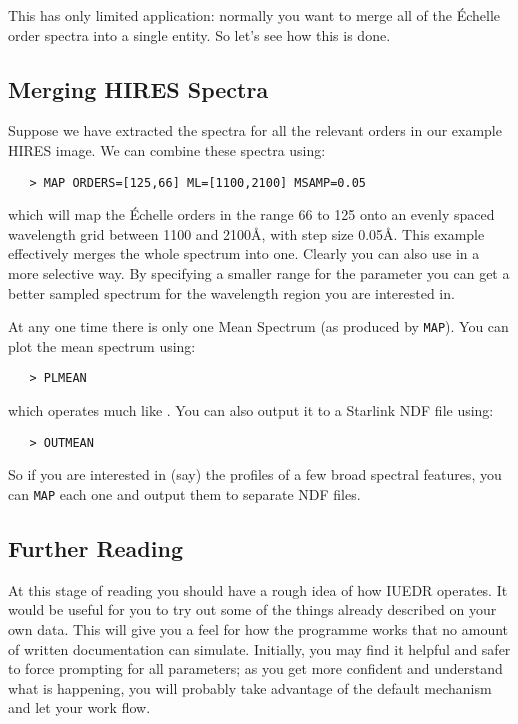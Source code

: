 This has only limited application: normally you want to merge all of the
\'{E}chelle order spectra into a single entity.  So let's see how this is done.


\subsection{Merging HIRES Spectra}

Suppose we have extracted the spectra for all the relevant orders in our
example HIRES image.  We can combine these spectra using:

\begin{verbatim}
   > MAP ORDERS=[125,66] ML=[1100,2100] MSAMP=0.05
\end{verbatim}

which will map the \'{E}chelle orders in the range 66 to 125 onto an evenly
spaced wavelength grid between 1100 and 2100\AA , with step size 0.05\AA\@.
This example effectively merges the whole spectrum into one.  Clearly you can
also use 
 in a more selective way.  By specifying a smaller range for
the 
 parameter you can get a better sampled spectrum
for the wavelength region you are interested in.

At any one time there is only one Mean Spectrum (as produced by \verb+MAP+)\@.
You can plot the mean spectrum using:

\begin{verbatim}
   > PLMEAN
\end{verbatim}

which operates much like \@.  You can also
output it to a Starlink NDF file using:

\begin{verbatim}
   > OUTMEAN
\end{verbatim}

So if you are interested in (say) the profiles of a few broad spectral
features, you can \verb+MAP+ each one and output them to separate NDF files.


\subsection{Further Reading}

At this stage of reading you should have a rough idea of how IUEDR
operates.  It would be useful for you to try out some of the things already
described on your own data.  This will give you a feel for how the programme
works that no amount of written documentation can simulate.  Initially,
you may find it helpful and safer to force prompting for all parameters;
as you get more confident and understand what is happening, you will probably
take advantage of the default mechanism and let your work flow.

